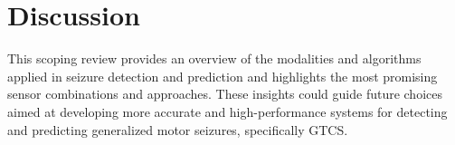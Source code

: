\section{Discussion}

This scoping review provides an overview of the modalities and algorithms applied in seizure detection and prediction and highlights the most promising sensor combinations and approaches. These insights could guide future choices aimed at developing more accurate and high-performance systems for detecting and predicting generalized motor seizures, specifically GTCS.









